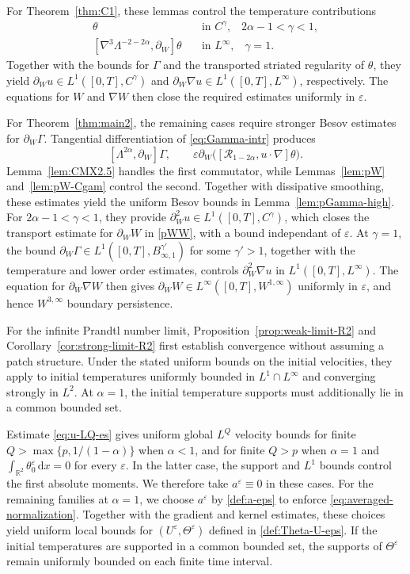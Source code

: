 \documentclass[reqno,11pt,a4paper]{amsart}
\newcommand{\dd}{\mathrm{d}}
\begin{document}
For Theorem~\ref{thm:C1}, these lemmas control
the temperature contributions
\begin{align*}
  [\nabla^2\Lambda^{-2-2\alpha},\partial_W]\theta
  &\quad\text{in }C^\gamma,
  \,\,\,\,\,2\alpha-1<\gamma<1,\\
  [\nabla^3\Lambda^{-2-2\alpha},\partial_W]\theta
  &\quad\text{in }L^\infty,
   \,\,\,\,\,\gamma=1.
\end{align*}
Together with the bounds for $\Gamma$
and the transported striated regularity of $\theta$,
they yield
$\partial_Wu\in L^1([0,T],C^\gamma)$
and $\partial_W\nabla u\in L^1([0,T],L^\infty)$,
respectively.
The equations for $W$ and $\nabla W$
then close the required estimates uniformly
in $\varepsilon$.


For Theorem~\ref{thm:main2}, the remaining cases require stronger Besov estimates
for $\partial_W\Gamma$.
Tangential differentiation of \eqref{eq:Gamma-intr}
produces
\[
  [\Lambda^{2\alpha},\partial_W]\Gamma,
  \qquad
  \varepsilon\partial_W
  \bigl([\mathcal R_{1-2\alpha},u\cdot\nabla]\theta\bigr).
\]
Lemma~\ref{lem:CMX2.5} handles the first commutator,
while Lemmas~\ref{lem:pW} and~\ref{lem:pW-Cgam}
control the second.
Together with dissipative smoothing, these estimates yield the uniform Besov bounds
in Lemma~\ref{lem:pGamma-high}.
For $2\alpha-1<\gamma<1$, they provide
$\partial_W^2u\in L^1([0,T],C^\gamma)$,
which closes the transport estimate
for $\partial_WW$ in \eqref{pWW}, with a bound independant of $\varepsilon$.
At $\gamma=1$, the bound
$\partial_W\Gamma\in L^1([0,T],B^{\gamma'}_{\infty,1})$
for some $\gamma'>1$, together with the temperature
and lower order estimates, controls $\partial_W^2\nabla u$
in $L^1([0,T],L^\infty)$.
The equation for $\partial_W\nabla W$ then gives
$\partial_WW\in L^\infty([0,T],W^{1,\infty})$ uniformly in $\varepsilon$,
and hence $W^{3,\infty}$ boundary persistence.

For the infinite Prandtl number limit,
Proposition~\ref{prop:weak-limit-R2}
and Corollary~\ref{cor:strong-limit-R2} first establish convergence without assuming a patch structure.
Under the stated uniform bounds on the initial velocities,
they apply to initial temperatures uniformly bounded
in $L^1\cap L^\infty$ and converging strongly in $L^2$.
At $\alpha=1$, the initial temperature supports
must additionally lie in a common bounded set.

Estimate \eqref{eq:u-LQ-es} gives uniform global $L^Q$
velocity bounds for finite
$Q>\max\{p,1/(1-\alpha)\}$ when $\alpha<1$,
and for finite $Q>p$ when $\alpha=1$ and
$\int_{\mathbb R^2}\theta_0^\varepsilon\,\dd x=0$
for every $\varepsilon$.
In the latter case, the support and $L^1$ bounds
control the first absolute moments.
We therefore take $a^\varepsilon\equiv0$ in these cases.
For the remaining families at $\alpha=1$,
we choose $a^\varepsilon$ by \eqref{def:a-eps}
to enforce \eqref{eq:averaged-normalization}.
Together with the gradient and kernel estimates,
these choices yield uniform local bounds for
$(U^\varepsilon,\Theta^\varepsilon)$
defined in \eqref{def:Theta-U-eps}.
If the initial temperatures are supported in a common bounded set,
the supports of $\Theta^\varepsilon$ remain uniformly bounded
on each finite time interval.
\end{document}
